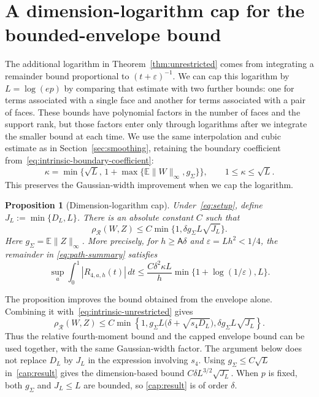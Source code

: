 \documentclass[11pt,letterpaper]{article}
\newtheorem{proposition}{Proposition}
\theoremstyle{remark}
\newcommand{\E}{\mathbb E}
\newcommand{\rh}{\rho_{\mathcal R}}
\begin{document}
\section{A dimension-logarithm cap for the bounded-envelope bound}
\label{app:dimension-cap}

The additional logarithm in Theorem~\ref{thm:unrestricted} comes
from integrating a remainder bound proportional to
$(t+\varepsilon)^{-1}$. We can cap this logarithm by
$L=\log(ep)$ by comparing that estimate with two further bounds:
one for terms associated with a single face and another for terms
associated with a pair of faces. These bounds have polynomial
factors in the number of faces and the support rank, but those
factors enter only through logarithms after we integrate the
smaller bound at each time. We use the same interpolation and
cubic estimate as in Section~\ref{sec:smoothing}, retaining the
boundary coefficient from~\eqref{eq:intrinsic-boundary-coefficient}:
\[
 \kappa=\min\{\sqrt L,\,1+\max\{\E\|W\|_\infty,g_\Sigma\}\},
 \qquad 1\le\kappa\le\sqrt L.
\]
This preserves the Gaussian-width improvement when we cap the logarithm.

\begin{proposition}[Dimension-logarithm cap]
\label{prop:dimension-cap}
Under~\eqref{eq:setup}, define $J_L:=\min\{D_L,L\}$. There is an
absolute constant $C$ such that
\begin{equation}
 \rh(W,Z)\le C\min\{1,\delta g_\Sigma L\sqrt{J_L}\}.
 \label{cap:result}
\end{equation}
Here $g_\Sigma=\E\|Z\|_\infty$. More precisely, for
$h\ge\mathsf A\delta$ and $\varepsilon=Lh^2<1/4$, the remainder in
\eqref{eq:path-summary} satisfies
\begin{equation}
 \sup_a\int_0^1|R_{4,a,h}(t)|\,dt
 \le\frac{C\delta^2\kappa L}h
       \min\{1+\log(1/\varepsilon),L\}.
 \label{cap:integrated}
\end{equation}
\end{proposition}

The proposition improves the bound obtained from the envelope
alone. Combining it with~\eqref{eq:intrinsic-unrestricted} gives
\[
 \rh(W,Z)\le C\min\left\{1,
 g_\Sigma L\bigl(\delta+\sqrt{s_4D_L}\bigr),
 \delta g_\Sigma L\sqrt{J_L}\right\}.
\]
Thus the relative fourth-moment bound and the capped envelope
bound can be used together, with the same Gaussian-width factor.
The argument below does not replace $D_L$ by $J_L$ in the expression
involving $s_4$. Using $g_\Sigma\le C\sqrt L$ in~\eqref{cap:result}
gives the dimension-based bound $C\delta L^{3/2}\sqrt{J_L}$.
When $p$ is fixed, both $g_\Sigma$ and $J_L\le L$ are bounded, so
\eqref{cap:result} is of order $\delta$.
\end{document}
